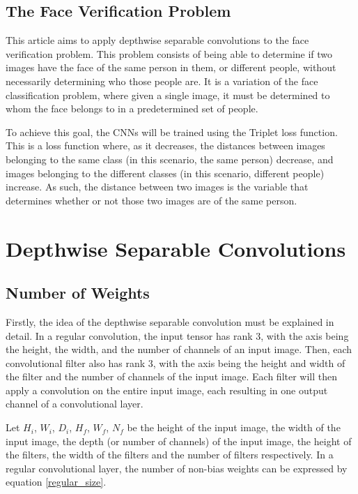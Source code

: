 \documentclass[runningheads]{llncs}
\begin{document}
\subsection{The Face Verification Problem}

This article aims to apply depthwise separable convolutions to the face verification problem. This problem consists of being able to determine if two images have the face of the same person in them, or different people, without necessarily determining who those people are. It is a variation of the face classification problem, where given a single image, it must be determined to whom the face belongs to in a predetermined set of people.

To achieve this goal, the CNNs will be trained using the Triplet loss function. This is a loss function where, as it decreases, the distances between images belonging to the same class (in this scenario, the same person) decrease, and images belonging to the different classes (in this scenario, different people) increase. As such, the distance between two images is the variable that determines whether or not those two images are of the same person.



\section{Depthwise Separable Convolutions}

\subsection{Number of Weights}

Firstly, the idea of the depthwise separable convolution must be explained in detail. In a regular convolution, the input tensor has rank 3, with the axis being the height, the width, and the number of channels of an input image. Then, each convolutional filter also has rank 3, with the axis being the height and width of the filter and the number of channels of the input image. Each filter will then apply a convolution on the entire input image, each resulting in one output channel of a convolutional layer.

Let $H_{i}$, $W_{i}$, $D_{i}$, $H_{f}$, $W_{f}$, $N_{f}$ be the height of the input image, the width of the input image, the depth (or number of channels) of the input image, the height of the filters, the width of the filters and the number of filters respectively. In a regular convolutional layer, the number of non-bias weights can be expressed by equation \ref{regular_size}.
\end{document}

